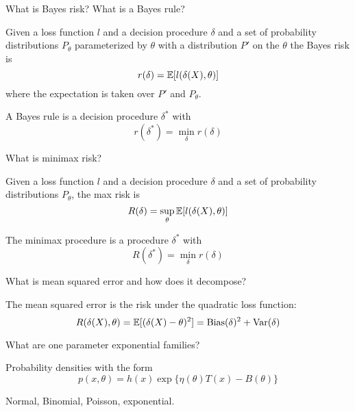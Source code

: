 \documentclass[avery5388,grid,frame]{flashcards}
\begin{document}


\begin{flashcard}
    {What is Bayes risk? What is a Bayes rule?}
    \begin{definition}
        Given a loss function $l$ and a decision procedure $\delta$ and a set of probability distributions $P_\theta$ parameterized by $\theta$ with a distribution $P'$ on the $\theta$ the Bayes risk is
        $$r(\delta) = \mathbb{E}[l(\delta(X),\theta)]$$
        where the expectation is taken over $P'$ and $P_\theta$.
    \end{definition}

    \begin{definition}
        A Bayes rule is a decision procedure $\delta^*$ with
        $$r(\delta^*) = \min_\delta r(\delta)$$
    \end{definition}
\end{flashcard}


\begin{flashcard}
    {What is minimax risk?}
    \begin{definition}
        Given a loss function $l$ and a decision procedure $\delta$ and a set of probability distributions $P_\theta$, the max risk is
        $$R(\delta) = \sup_\theta \mathbb{E}[l(\delta(X),\theta)]$$
    \end{definition}

    \begin{definition}
        The minimax procedure is a procedure $\delta^*$ with
        $$R(\delta^*) = \min_\delta r(\delta)$$
    \end{definition}
\end{flashcard}


\begin{flashcard}
    {What is mean squared error and how does it decompose?}
    \begin{definition}
        The mean squared error is the risk under the quadratic loss function:
        $$R(\delta(X),\theta) = \mathbb{E}[(\delta(X) - \theta)^2] = \text{Bias}(\delta)^2 + \text{Var}(\delta)$$
    \end{definition}
\end{flashcard}


\begin{flashcard}
    {What are one parameter exponential families?}
    \begin{definition}
        Probability densities with the form
        $$p(x,\theta) = h(x) \exp \{ \eta(\theta)T(x) - B(\theta) \}$$
    \end{definition}

    \begin{example}
        Normal, Binomial, Poisson, exponential.
    \end{example}
\end{flashcard}
\end{document}
